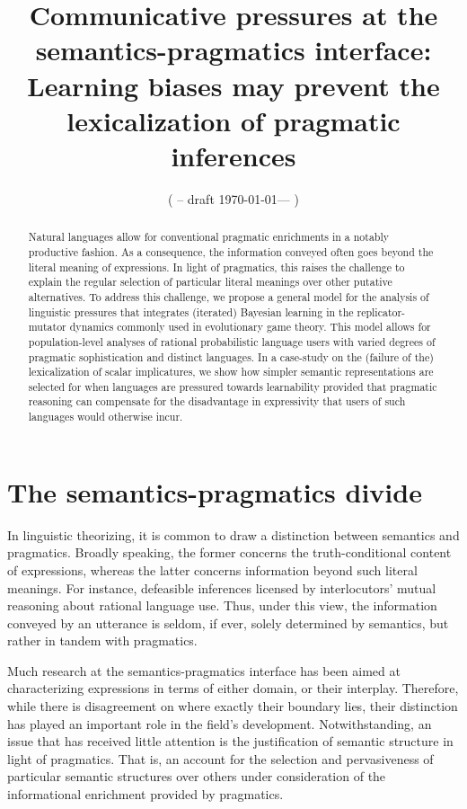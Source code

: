\documentclass[a4paper]{article}
\title{Communicative pressures at the semantics-pragmatics interface:\\ Learning biases may prevent the lexicalization of pragmatic inferences}
\author{%
    ( -- draft \today --- )
}
\date{}
\begin{document}
\maketitle
\section{The semantics-pragmatics divide}\label{sec:introduction}

\begin{abstract} Natural languages allow for conventional pragmatic enrichments in a notably productive fashion. As a consequence, the information conveyed often goes beyond the literal meaning of expressions. In light of pragmatics, this raises the challenge to explain the regular selection of particular literal meanings over other putative alternatives. To address this challenge, we propose a general model for the analysis of linguistic pressures that integrates (iterated) Bayesian learning in the replicator-mutator dynamics commonly used in evolutionary game theory. This model allows for population-level analyses of rational probabilistic language users with varied degrees of pragmatic sophistication and distinct languages. In a case-study on the (failure of the) lexicalization of scalar implicatures, we show how simpler semantic representations are selected for when languages are pressured towards learnability provided that pragmatic reasoning can compensate for the disadvantage in expressivity that users of such languages would otherwise incur.
\end{abstract}

In linguistic theorizing, it is common to draw a distinction between semantics and pragmatics. Broadly speaking, the former concerns the truth-conditional content of expressions, whereas the latter concerns information beyond such literal meanings. For instance, defeasible inferences licensed by interlocutors' mutual reasoning about rational language use. Thus, under this view, the information conveyed by an utterance is seldom, if ever, solely determined by semantics, but rather in tandem with pragmatics.

Much research at the semantics-pragmatics interface has been aimed at characterizing expressions in terms of either domain, or their interplay. Therefore, while there is disagreement on where exactly their boundary lies, their distinction has played an important role in the field's development. Notwithstanding, an issue that has received little attention is the justification of semantic structure in light of pragmatics. That is, an account for the selection and pervasiveness of particular semantic structures over others under consideration of the informational enrichment provided by pragmatics. 
\end{document}
